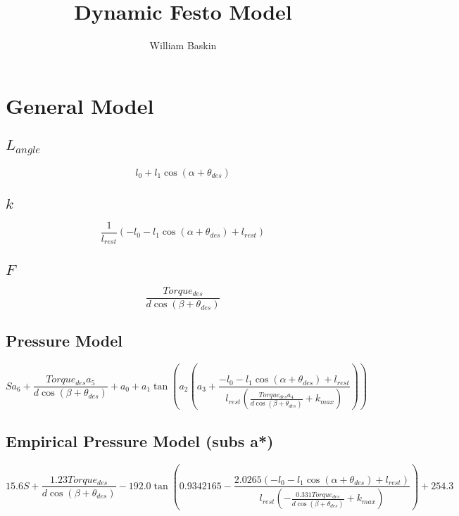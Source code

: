\documentclass[12pt, letterpaper, oneside, notitlepage, onecolumn]{article}
\author{William Baskin}
\title{Dynamic Festo Model}
\begin{document}
\maketitle

\section{General Model}

\subsection{$L_{angle}$}
\begin{equation}
l_{0} + l_{1} \cos{\left (\alpha + \theta_{des} \right )}
\end{equation}

\subsection{$k$}
\begin{equation}
\frac{1}{l_{rest}} \left(- l_{0} - l_{1} \cos{\left (\alpha + \theta_{des}
\right )} + l_{rest}\right)
\end{equation}

\subsection{$F$}
\begin{equation}
\frac{Torque_{des}}{d \cos{\left (\beta + \theta_{des} \right )}}
\end{equation}

\subsection{Pressure Model}
\begin{equation}
S a_{6} + \frac{Torque_{des} a_{5}}{d \cos{\left (\beta + \theta_{des} \right
)}} + a_{0} + a_{1} \tan{\left (a_{2} \left(a_{3} + \frac{- l_{0} - l_{1}
\cos{\left (\alpha + \theta_{des} \right )} + l_{rest}}{l_{rest}
\left(\frac{Torque_{des} a_{4}}{d \cos{\left (\beta + \theta_{des} \right )}} +
k_{max}\right)}\right) \right )}
\end{equation}

\subsection{Empirical Pressure Model (subs a*)}
\begin{equation}
15.6 S + \frac{1.23 Torque_{des}}{d \cos{\left (\beta + \theta_{des} \right )}}
- 192.0 \tan{\left (0.9342165 - \frac{2.0265 \left(- l_{0} - l_{1} \cos{\left
  (\alpha + \theta_{des} \right )} + l_{rest}\right)}{l_{rest} \left(-
  \frac{0.331 Torque_{des}}{d \cos{\left (\beta + \theta_{des} \right )}} +
  k_{max}\right)} \right )} + 254.3
  \end{equation}
\end{document}
